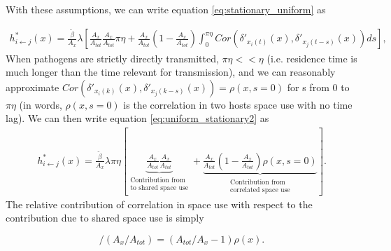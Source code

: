 \documentclass[letterpaper]{article}
\begin{document}
With these assumptions, we can write equation \ref{eq:stationary_uniform} as

\begin{equation}
    \begin{aligned}
        h^*_{i \leftarrow j}(x) = \frac{\tilde\beta}{A_x} \lambda \left[\frac{A_x}{A_{tot}}\frac{A_x}{A_{tot}} \pi \eta + \frac{A_x}{A_{tot}}\left(1 - \frac{A_x}{A_{tot}}\right) \int_{0}^{\pi \eta} Cor(\delta'_{x_i(t)}(x), \delta'_{x_j(t - s)}(x)) ds\right],
    \end{aligned}
    \label{eq:uniform_stationary2}
\end{equation}
When pathogens are strictly directly transmitted, $\pi \eta << \eta$ (i.e. residence time is much longer than the time relevant for transmission), and we can reasonably approximate $Cor(\delta'_{x_i(k)}(x), \delta'_{x_j(k - s)}(x)) = \rho(x, s = 0)$ for s from 0 to $\pi \eta$ (in words, $\rho(x, s = 0)$ is the correlation in two hosts space use with no time lag). 
We can then write equation \ref{eq:uniform_stationary2} as 
\begin{equation}
    \begin{aligned}
        h^*_{i \leftarrow j}(x) =  \frac{\tilde\beta}{A_x}  \lambda \pi \eta \left[\underbrace{\frac{A_x}{A_{tot}}\frac{A_x}{A_{tot}}}_{\substack{\text{Contribution from} \\  \text{to shared space use}}} + \underbrace{\frac{A_x}{A_{tot}}(1 - \frac{A_x}{A_{tot}}) \rho(x, s=0)}_{\substack{\text{Contribution from} \\ \text{correlated space use}}} \right].
    \end{aligned}
    \label{eq:uniform_direct}
\end{equation}
The relative contribution of correlation in space use with respect to the contribution due to shared space use is simply 


\begin{equation}
    [(1 - (A_x / A_{tot}))\rho(x)] / (A_x / A_{tot})=(A_{tot}/A_x-1)\rho(x). 
    \label{eq:analytical_relationship}
\end{equation}
\end{document}
